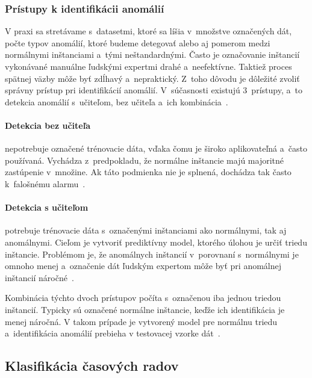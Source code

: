\documentclass[a4paper,twoside,slovak,12pt]{article}
\begin{document}
\subsubsection{Prístupy k identifikácii anomálií}
V praxi sa stretávame s~datasetmi, ktoré sa líšia v~množstve označených dát,
počte typov anomálií, ktoré budeme detegovať alebo aj pomerom medzi normálnymi
inštanciami a~tými neštandardnými. Často je označovanie inštancií vykonávané
manuálne ľudskými expertmi drahé a~neefektívne. Taktiež proces spätnej väzby
môže byť zdĺhavý a~nepraktický. Z~toho dôvodu je dôležité zvoliť správny
prístup pri identifikácií anomálií. V~súčasnosti existujú 3~prístupy, a~to
detekcia anomálií s~učiteľom, bez učiteľa a~ich kombinácia~\cite{Chandola2009}.

\paragraph{Detekcia bez učiteľa} nepotrebuje označené trénovacie dáta, vďaka
čomu je široko aplikovateľná a~často používaná. Vychádza z~predpokladu, že
normálne inštancie majú majoritné zastúpenie v~množine. Ak táto podmienka nie je
splnená, dochádza tak často k~falošnému alarmu~\cite{Chandola2009}.

\paragraph{Detekcia s učiteľom} potrebuje trénovacie dáta s~označenými
inštanciami ako normálnymi, tak aj anomálnymi. Cieľom je vytvoriť prediktívny
model, ktorého úlohou je určiť triedu inštancie. Problémom je, že anomálnych
inštancií v~porovnaní s~normálnymi je omnoho menej a~označenie dát ľudským
expertom môže byť pri anomálnej inštancií náročné~\cite{Chandola2009}.

Kombinácia týchto dvoch prístupov počíta s~označenou iba jednou triedou
inštancií. Typicky sú označené normálne inštancie, keďže ich identifikácia je
menej náročná. V takom prípade je vytvorený model pre normálnu triedu
a~identifikácia anomálií prebieha v testovacej vzorke dát~\cite{Chandola2009}.


\subsection{Klasifikácia časových radov}
\end{document}
